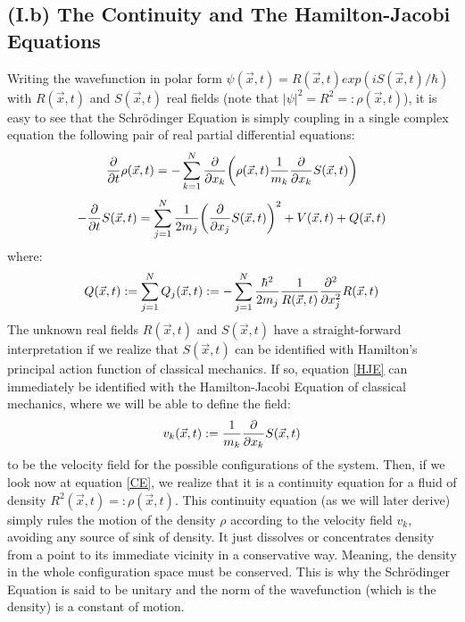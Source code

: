 \documentclass[11pt, a4paper]{article} %
\begin{document}
\subsection*{(I.b) The Continuity and The Hamilton-Jacobi Equations}
Writing the wavefunction in polar form $\psi(\vec{x},t)=R(\vec{x},t)exp(iS(\vec{x},t)/\hbar)$ with $R(\vec{x},t)$ and $S(\vec{x},t)$ real fields (note that $|\psi|^2=R^2=:\rho(\vec{x},t)$), it is easy to see that the Schrödinger Equation is simply coupling in a single complex equation the following pair of real partial differential equations:
\begin{equation}\label{CE}
\pdv{}{t} \rho(\vec{x},t)=-\sum_{k=1}^N \pdv{}{x_k}\qty( \rho(\vec{x},t)\frac{1}{m_k}\pdv{}{x_k} S(\vec{x},t) )
\end{equation}
\begin{equation}\label{HJE}
-\pdv{}{t}S(\vec{x},t) = \sum_{j=1}^N \frac{1}{2m_j} \qty(\pdv{}{x_j} S(\vec{x},t) )^2+ V(\vec{x},t)+Q(\vec{x},t)
\end{equation}
where:
\begin{equation}\label{QP}
Q(\vec{x},t):=\sum_{j=1}^N Q_j(\vec{x},t):=-\sum_{j=1}^N \frac{\hbar^2}{2m_j}\frac{1}{R(\vec{x},t)}\pdv[2]{}{x_j} R(\vec{x},t)
\end{equation}
The unknown real fields $R(\vec{x},t)$ and $S(\vec{x},t)$ have a straight-forward interpretation if we realize that $S(\vec{x},t)$ can be identified with Hamilton's principal action function of classical mechanics. If so, equation \eqref{HJE} can immediately be identified with the Hamilton-Jacobi Equation of classical mechanics, where we will be able to define the field:%
\begin{equation}
v_k(\vec{x},t):=\frac{1}{m_k}\pdv{}{x_k}S(\vec{x},t)
\end{equation}
to be the velocity field for the possible configurations of the system. Then, if we look now at equation \eqref{CE}, we realize that it is a continuity equation for a fluid of density $R^2(\vec{x},t)=:\rho(\vec{x},t)$. This continuity equation (as we will later derive) simply rules the motion of the density $\rho$ according to the velocity field $v_k$, avoiding any source of sink of density. It just dissolves or concentrates density from a point to its immediate vicinity in a conservative way. Meaning, the density in the whole configuration space must be conserved. This is why the Schrödinger Equation is said to be unitary and the norm of the wavefunction (which is the density) is a constant of motion.
\end{document}
